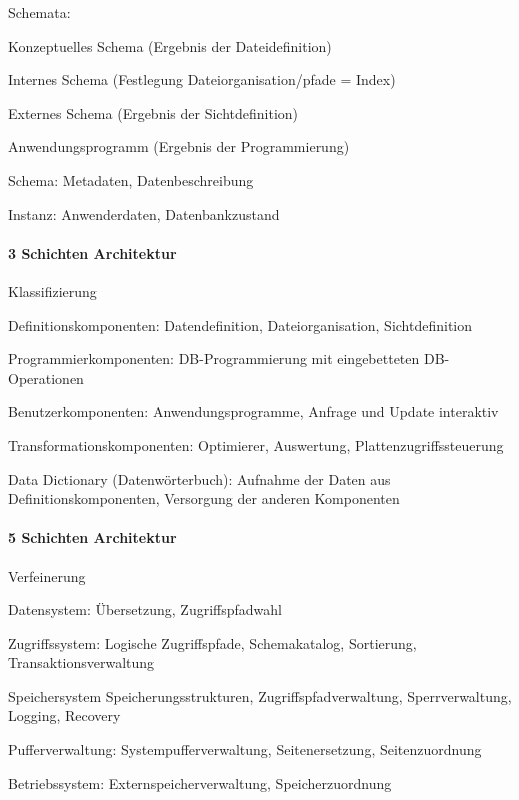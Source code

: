 \documentclass[a4paper]{article}
\begin{document}
\begin{multicols}{3}
    Schemata:
    \begin{itemize*}
        \item Konzeptuelles Schema (Ergebnis der Dateidefinition)
        \item Internes Schema (Festlegung Dateiorganisation/pfade = Index)
        \item Externes Schema (Ergebnis der Sichtdefinition)
        \item Anwendungsprogramm (Ergebnis der Programmierung)
        \begin{itemize*}
            \item Schema: Metadaten, Datenbeschreibung
            \item Instanz: Anwenderdaten, Datenbankzustand
        \end{itemize*}
    \end{itemize*}

    \paragraph{3 Schichten Architektur}
    Klassifizierung
    \begin{itemize*}
        \item Definitionskomponenten: Datendefinition, Dateiorganisation, Sichtdefinition
        \item Programmierkomponenten: DB-Programmierung mit eingebetteten DB-Operationen
        \item Benutzerkomponenten: Anwendungsprogramme, Anfrage und Update interaktiv
        \item Transformationskomponenten: Optimierer, Auswertung, Plattenzugriffssteuerung
        \item Data Dictionary (Datenwörterbuch): Aufnahme der Daten aus Definitionskomponenten, Versorgung der anderen Komponenten
    \end{itemize*}

    \paragraph{5 Schichten Architektur}
    Verfeinerung
    \begin{itemize*}
        \item Datensystem: Übersetzung, Zugriffspfadwahl
        \item Zugriffssystem: Logische Zugriffspfade, Schemakatalog, Sortierung, Transaktionsverwaltung
        \item Speichersystem Speicherungsstrukturen, Zugriffspfadverwaltung, Sperrverwaltung, Logging, Recovery
        \item Pufferverwaltung: Systempufferverwaltung, Seitenersetzung, Seitenzuordnung
        \item Betriebssystem: Externspeicherverwaltung, Speicherzuordnung
    \end{itemize*}


\end{multicols}
\end{document}
